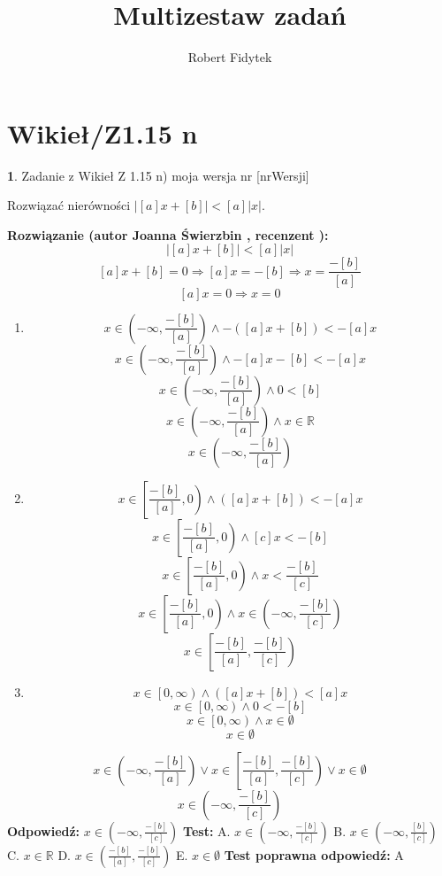 \documentclass[12pt, a4paper]{article}
\title{Multizestaw zadań}
\author{Robert Fidytek}
\date{}
\theoremstyle{definition} %
\newtheorem{zad}{}
\newcommand{\kategoria}[1]{\section{#1}} %
\newcommand{\zadStart}[1]{\begin{zad}#1\newline} %
\newcommand{\zadStop}{\end{zad}}   %
\newcommand{\rozwStart}[2]{\noindent \textbf{Rozwiązanie (autor #1 , recenzent #2): }\newline} %
\newcommand{\rozwStop}{\newline}                                            %
\newcommand{\odpStart}{\noindent \textbf{Odpowiedź:}\newline}    %
\newcommand{\odpStop}{\newline}                                             %
\newcommand{\testStart}{\noindent \textbf{Test:}\newline} %
\newcommand{\testStop}{\newline} %
\newcommand{\kluczStart}{\noindent \textbf{Test poprawna odpowiedź:}\newline} %
\newcommand{\kluczStop}{\newline} %
\begin{document}
\maketitle


\kategoria{Wikieł/Z1.15 n}
\zadStart{Zadanie z Wikieł Z 1.15 n) moja wersja nr [nrWersji]}


Rozwiązać nierówności  $|[a]x+[b]| < [a]|x|$.
\zadStop
\rozwStart{Joanna Świerzbin}{}
$$|[a]x+[b]| < [a]|x|$$
$$[a]x+[b] = 0 \Rightarrow [a]x = -[b] \Rightarrow x = \frac{-[b]}{[a]} $$
$$[a]x = 0 \Rightarrow x=0 $$
\begin{enumerate}
\item $$x \in \left( -\infty , \frac{-[b]}{[a]} \right) \land -\left([a]x+[b]\right)<-[a]x$$
$$x \in \left( -\infty , \frac{-[b]}{[a]} \right) \land -[a]x-[b]<-[a]x$$
$$x \in \left( -\infty , \frac{-[b]}{[a]} \right) \land 0<[b]$$
$$x \in \left( -\infty , \frac{-[b]}{[a]} \right) \land x \in \mathbb{R}$$
$$x \in \left( -\infty , \frac{-[b]}{[a]} \right)$$

\item $$x \in \left[ \frac{-[b]}{[a]},0 \right) \land ([a]x+[b])<-[a]x$$
$$x \in \left[ \frac{-[b]}{[a]},0 \right) \land [c]x<-[b]$$
$$x \in \left[ \frac{-[b]}{[a]},0 \right) \land x<\frac{-[b]}{[c]}$$
$$x \in \left[ \frac{-[b]}{[a]},0 \right) \land x\in \left(-\infty,\frac{-[b]}{[c]}\right)$$
$$x \in \left[ \frac{-[b]}{[a]} ,\frac{-[b]}{[c]}\right)$$

\item $$x \in \left[0 , \infty \right) \land ([a]x+[b])<[a]x$$
 $$x \in \left[0 , \infty \right) \land 0<-[b]$$
 $$x \in \left[0 , \infty \right) \land x \in \emptyset$$
 $$ x \in \emptyset$$
\end{enumerate}
$$x \in \left( -\infty , \frac{-[b]}{[a]} \right) \vee x \in \left[ \frac{-[b]}{[a]} ,\frac{-[b]}{[c]}\right) \vee  x \in \emptyset $$
$$x \in \left( -\infty , \frac{-[b]}{[c]}\right) $$
\rozwStop
\odpStart
$x \in \left( -\infty , \frac{-[b]}{[c]}\right) $
\odpStop
\testStart
A. $x \in \left( -\infty , \frac{-[b]}{[c]}\right) $
B. $x \in \left( -\infty , \frac{[b]}{[c]}\right) $
C. $x \in \mathbb{R} $
D. $x \in \left( \frac{-[b]}{[a]} , \frac{-[b]}{[c]}\right) $
E. $ x \in \emptyset $
\testStop
\kluczStart
A
\kluczStop
\end{document}

